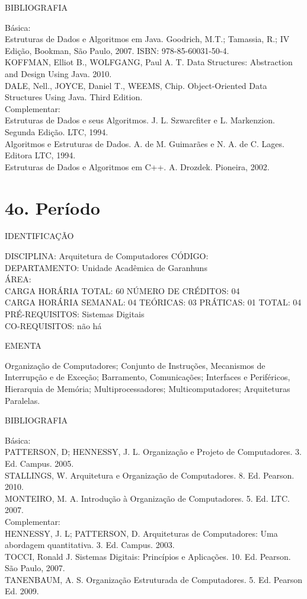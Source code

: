\documentclass[
	12pt,				%
	openright,			%
  oneside,     %
	a4paper,			%
	chapter=TITLE,		%
	english,			%
	french,				%
	spanish,			%
	brazil				%
	]{abntex2}
\begin{document}
\begin{apendicesenv}
BIBLIOGRAFIA 

Básica:\\
Estruturas de Dados e Algoritmos em Java. Goodrich, M.T.; Tamassia, R.;
IV Edição, Bookman, São Paulo, 2007. ISBN: 978-85-60031-50-4.\\
KOFFMAN, Elliot B., WOLFGANG, Paul A. T. Data Structures: Abstraction
and Design Using Java. 2010.\\
DALE, Nell., JOYCE, Daniel T., WEEMS, Chip. Object-Oriented Data
Structures Using Java. Third Edition.\\
Complementar:\\
Estruturas de Dados e seus Algoritmos. J. L. Szwarcfiter e L.
Markenzion. Segunda Edição. LTC, 1994.\\
Algoritmos e Estruturas de Dados. A. de M. Guimarães e N. A. de C.
Lages. Editora LTC, 1994.\\
Estruturas de Dados e Algoritmos em C++. A. Drozdek. Pioneira, 2002.

\newpage 

\section*{4o. Período}

IDENTIFICAÇÃO

DISCIPLINA: Arquitetura de Computadores CÓDIGO:\\ 
DEPARTAMENTO: Unidade Acadêmica de Garanhuns\\
ÁREA:\\
CARGA HORÁRIA TOTAL: 60 NÚMERO DE CRÉDITOS: 04\\
CARGA HORÁRIA SEMANAL: 04 TEÓRICAS: 03 PRÁTICAS: 01 TOTAL: 04 \\
PRÉ-REQUISITOS: Sistemas Digitais\\
CO-REQUISITOS: não há

EMENTA 

Organização de Computadores; Conjunto de Instruções, Mecanismos de
Interrupção e de Exceção; Barramento, Comunicações; Interfaces e
Periféricos, Hierarquia de Memória; Multiprocessadores;
Multicomputadores; Arquiteturas Paralelas.

BIBLIOGRAFIA 

Básica:\\
PATTERSON, D; HENNESSY, J. L. Organização e Projeto de Computadores. 3.
Ed. Campus. 2005.\\
STALLINGS, W. Arquitetura e Organização de Computadores. 8. Ed. Pearson.
2010.\\
MONTEIRO, M. A. Introdução à Organização de Computadores. 5. Ed. LTC.
2007.\\
Complementar:\\
HENNESSY, J. L; PATTERSON, D. Arquiteturas de Computadores: Uma
abordagem quantitativa. 3. Ed. Campus. 2003.\\
TOCCI, Ronald J. Sistemas Digitais: Princípios e Aplicações. 10. Ed.
Pearson. São Paulo, 2007.\\
TANENBAUM, A. S. Organização Estruturada de Computadores. 5. Ed. Pearson Ed. 2009.\\



\end{apendicesenv}
\end{document}
